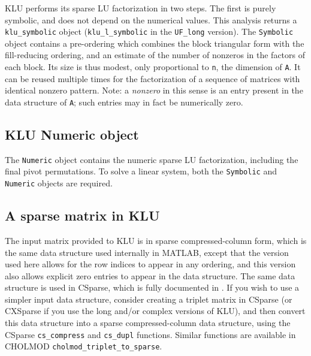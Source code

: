 \documentclass[11pt]{article}
\begin{document}
KLU performs its sparse LU factorization in two steps.  The first is purely
symbolic, and does not depend on the numerical values.  This analysis returns a
{\tt klu\_symbolic} object ({\tt klu\_l\_symbolic} in the {\tt UF\_long}
version).  The {\tt Symbolic} object contains a pre-ordering which combines the
block triangular form with the fill-reducing ordering, and an estimate of the
number of nonzeros in the factors of each block.  Its size is thus modest, only
proportional to {\tt n}, the dimension of {\tt A}.  It can be reused multiple
times for the factorization of a sequence of matrices with identical nonzero
pattern.  Note: a {\em nonzero} in this sense is an entry present in the data
structure of {\tt A}; such entries may in fact be numerically zero.

\subsection{KLU Numeric object}

The {\tt Numeric} object contains the numeric sparse LU factorization, including
the final pivot permutations.  To solve a linear system, both the {\tt Symbolic}
and {\tt Numeric} objects are required.

\subsection{A sparse matrix in KLU}


The input matrix provided to KLU is in sparse compressed-column form, which is
the same data structure used internally in MATLAB, except that the version used
here allows for the row indices to appear in any ordering, and this version
also allows explicit zero entries to appear in the data structure.  The same
data structure is used in CSparse, which is fully documented in
\cite{Davis06book}.  If you wish to use a simpler input data structure,
consider creating a triplet matrix in CSparse (or CXSparse if you use the long
and/or complex versions of KLU), and then convert this data structure into a
sparse compressed-column data structure, using the CSparse {\tt cs\_compress}
and {\tt cs\_dupl} functions.  Similar functions are available in CHOLMOD
{\tt cholmod\_triplet\_to\_sparse}.
\end{document}
